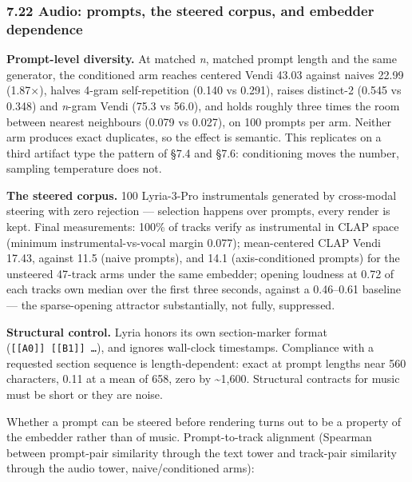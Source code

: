 \documentclass[
  10pt,
]{article}
\theoremstyle{plain}
\theoremstyle{definition}
\begin{document}
\subsubsection{7.22 Audio: prompts, the steered corpus, and embedder
dependence}\label{722-audio-prompts-the-steered-corpus-and-embedder-dependence}

\textbf{Prompt-level diversity.} At matched \emph{n}, matched prompt
length and the same generator, the conditioned arm reaches centered
Vendi 43.03 against naive\textquotesingle s 22.99 (1.87×), halves 4-gram
self-repetition (0.140 vs 0.291), raises distinct-2 (0.545 vs 0.348) and
\emph{n}-gram Vendi (75.3 vs 56.0), and holds roughly three times the
room between nearest neighbours (0.079 vs 0.027), on 100 prompts per
arm. Neither arm produces exact duplicates, so the effect is semantic.
This replicates on a third artifact type the pattern of §7.4 and §7.6:
conditioning moves the number, sampling temperature does not.

\textbf{The steered corpus.} 100 Lyria-3-Pro instrumentals generated by
cross-modal steering with zero rejection --- selection happens over
prompts, every render is kept. Final measurements: 100\% of tracks
verify as instrumental in CLAP space (minimum instrumental-vs-vocal
margin 0.077); mean-centered CLAP Vendi 17.43, against 11.5 (naive
prompts), and 14.1 (axis-conditioned prompts) for the unsteered 47-track
arms under the same embedder; opening loudness at 0.72 of each
track\textquotesingle s own median over the first three seconds, against
a 0.46--0.61 baseline --- the sparse-opening attractor substantially,
not fully, suppressed.

\textbf{Structural control.} Lyria honors its own section-marker format
(\texttt{{[}{[}A0{]}{]}\ {[}{[}B1{]}{]}\ …}), and ignores wall-clock
timestamps. Compliance with a requested section sequence is
length-dependent: exact at prompt lengths near 560 characters, 0.11 at a
mean of 658, zero by \textasciitilde1,600. Structural contracts for
music must be short or they are noise.

Whether a prompt can be steered before rendering turns out to be a
property of the embedder rather than of music. Prompt-to-track alignment
(Spearman between prompt-pair similarity through the text tower and
track-pair similarity through the audio tower, naive/conditioned arms):
\end{document}
